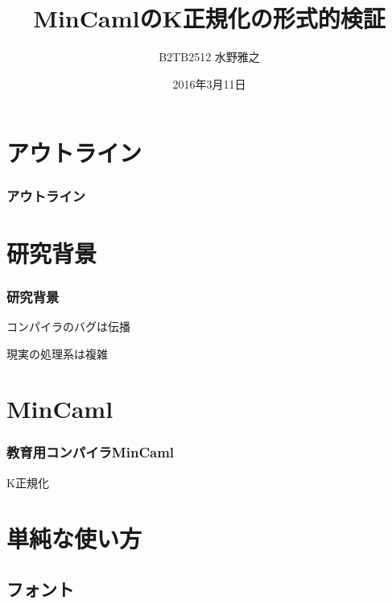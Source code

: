 \documentclass[dvipdfmx,cjk,xcolor=dvipsnames,envcountsect,notheorems,12pt]{beamer}
\title{MinCamlのK正規化の形式的検証}
\author{B2TB2512 水野雅之}
\institute[東北大学　住井・松田研]{工学部　電気情報物理工学科\\住井・松田研究室}%
\date{2016年3月11日}
\theoremstyle{definition}
\begin{document}
\frame[plain]{\titlepage}%

\section*{アウトライン}

\begin{frame}
  \frametitle{アウトライン}
  \tableofcontents[sectionstyle=show,subsectionstyle=hide]
\end{frame}

\section{研究背景}

\begin{frame}
	\frametitle{研究背景}
	\Huge コンパイラのバグは伝播
\end{frame}

\begin{frame}
	\Huge 現実の処理系は複雑
\end{frame}

\section{MinCaml}
\begin{frame}
	\frametitle{教育用コンパイラMinCaml}
	\Huge 
\end{frame}

\begin{frame}
	\Huge K正規化
\end{frame}

\section{単純な使い方}

\subsection{フォント}
\end{document}
